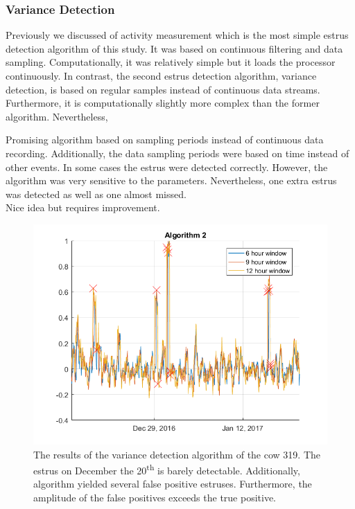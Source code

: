 \documentclass[english,12pt,a4paper,pdftex,elec,utf8]{aaltothesis}
\begin{document}
\subsubsection{Variance Detection} \label{variancedetectionevaluation}

Previously we discussed of activity measurement which is the most simple estrus detection algorithm of this study. It was based on continuous filtering and data sampling. Computationally, it was relatively simple but it loads the processor continuously. In contrast, the second estrus detection algorithm, variance detection, is based on regular samples instead of continuous data streams. Furthermore, it is computationally slightly more complex than the former algorithm. Nevertheless, 



Promising algorithm based on sampling periods instead of continuous data recording. Additionally, the data sampling periods were based on time instead of other events. In some cases the estrus were detected correctly. However, the algorithm was very sensitive to the parameters. Nevertheless, one extra estrus was detected as well as one almost missed. \\

Nice idea but requires improvement.



\begin{figure}[htb]
\centering
\includegraphics[width = 0.75 \textwidth]{figures/algorithm2_cow319}
\caption{The results of the variance detection algorithm of the cow 319. The estrus on December the 20\textsuperscript{th} is barely detectable. Additionally, algorithm yielded several false positive estruses. Furthermore, the amplitude of the false positives exceeds the true positive.}
\end{figure}
\end{document}
